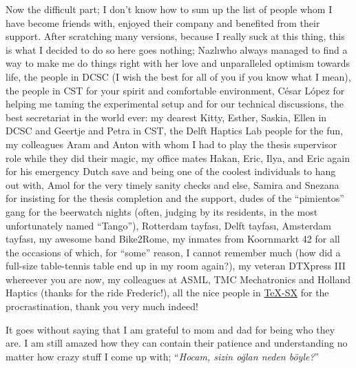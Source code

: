 Now the difficult part; I don't know how to sum up the list of people whom I have become friends with, enjoyed their company and benefited 
from their support. After scratching many versions, because I really suck at this thing, this is what I decided to do so here goes nothing; 
Nazl\i\space who always managed to find a way to make me do things right with her love and unparalleled optimism towards life, the people 
in DCSC (I wish the best for all of you if you know what I mean), the people in CST for your spirit and comfortable environment, C\'{e}sar 
L\'{o}pez for helping me taming the experimental setup and for our technical discussions, the best secretariat in the world ever: my dearest 
Kitty, Esther, Saskia, Ellen in DCSC and Geertje and Petra in CST, the Delft Haptics Lab people for the fun, my colleagues Aram and Anton 
with whom I had to play the thesis supervisor role while they did their magic, my office mates Hakan, Eric, Ilya, and Eric again for his 
emergency Dutch save and being one of the coolest individuals to hang out with, Amol for the very timely sanity checks and else, 
Samira and Snezana for insisting for the thesis completion and the support, dudes of the \enquote{pimientos} 
gang for the beerwatch nights (often, judging by its residents, in the most unfortunately named \enquote{Tango}), Rotterdam tayfas\i, Delft 
tayfas\i, Amsterdam tayfas\i, my awesome band Bike2Rome, my inmates from Koornmarkt 42 for all the occasions of which, for \enquote{some} 
reason, I cannot remember much (how did a full-size table-tennis table end up in my room again?), my veteran DTXpress III whereever you are 
now, my colleagues at ASML, TMC Mechatronics and Holland Haptics (thanks for the ride Frederic!), all the nice people in 
\href{http://tex.stackexchange.com}{\TeX-SX} for the procrastination, thank you very much indeed!


It goes without saying that I am grateful to mom and dad for being who they are. I am still amazed how they can contain their patience and 
understanding no matter how crazy stuff I come up with; \enquote{\emph{Hocam, sizin o\u{g}lan neden b\"{o}yle?}}